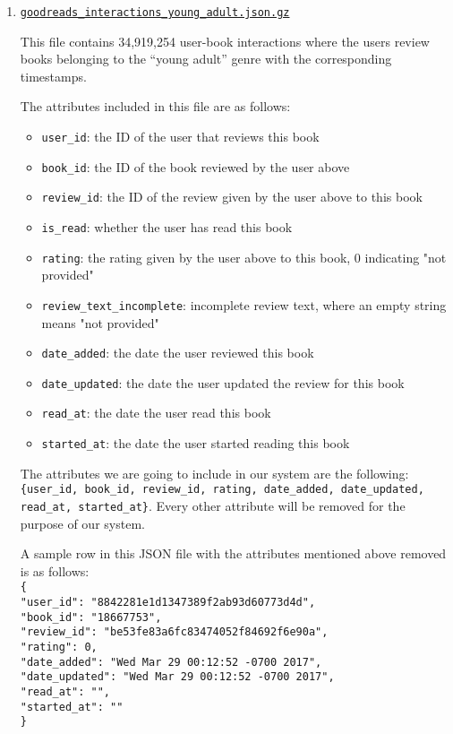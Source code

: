 \documentclass[fontsize=11pt]{article}
\begin{document}
\begin{itemize}
\begin{enumerate}
\item \texttt{\href{https://drive.google.com/uc?id=1NNX7SWcKahezLFNyiW88QFPAqOAYP5qg}{goodreads\_interactions\_young\_adult.json.gz}}
 
This file contains 34,919,254 user-book interactions where the users review books belonging to the “young adult” genre with the corresponding timestamps.
 
The attributes included in this file are as follows:
\begin{itemize}
\item \texttt{user\_id}: the ID of the user that reviews this book
\item \texttt{book\_id}: the ID of the book reviewed by the user above
\item \texttt{review\_id}: the ID of the review given by the user above to this book
\item \texttt{is\_read}: whether the user has read this book
\item \texttt{rating}: the rating given by the user above to this book, 0 indicating "not provided"
\item \texttt{review\_text\_incomplete}: incomplete review text, where an empty string means "not provided"
\item \texttt{date\_added}: the date the user reviewed this book
\item \texttt{date\_updated}: the date the user updated the review for this book
\item \texttt{read\_at}: the date the user read this book
\item \texttt{started\_at}: the date the user started reading this book
\end{itemize}

The attributes we are going to include in our system are the following:
\texttt{\{user\_id, book\_id, review\_id, rating, date\_added, date\_updated, read\_at, started\_at\}}. Every other attribute will be removed for the purpose of our system.
 
A sample row in this JSON file with the attributes mentioned above removed is as follows:\\
\texttt{\{\\
"user\_id": "8842281e1d1347389f2ab93d60773d4d",\\
"book\_id": "18667753",\\
"review\_id": "be53fe83a6fc83474052f84692f6e90a",\\
"rating": 0,\\
"date\_added": "Wed Mar 29 00:12:52 -0700 2017", \\
"date\_updated": "Wed Mar 29 00:12:52 -0700 2017",\\
"read\_at": "",\\
"started\_at": ""\\
\}} \\


\end{enumerate}
\end{itemize}
\end{document}
